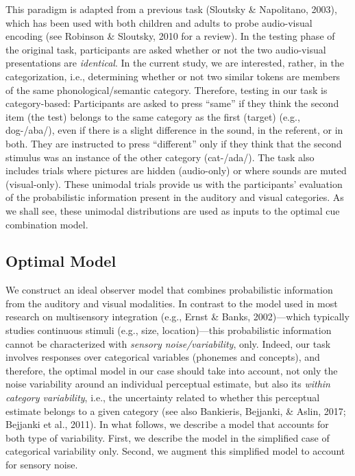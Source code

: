 \documentclass[english,floatsintext,man]{apa6}
\theoremstyle{definition}
\theoremstyle{definition}
\theoremstyle{definition}
\theoremstyle{remark}
\begin{document}
This paradigm is adapted from a previous task (Sloutsky \& Napolitano,
2003), which has been used with both children and adults to probe
audio-visual encoding (see Robinson \& Sloutsky, 2010 for a review). In
the testing phase of the original task, participants are asked whether
or not the two audio-visual presentations are \emph{identical}. In the
current study, we are interested, rather, in the categorization, i.e.,
determining whether or not two similar tokens are members of the same
phonological/semantic category. Therefore, testing in our task is
category-based: Participants are asked to press \enquote{same} if they
think the second item (the test) belongs to the same category as the
first (target) (e.g., dog-/aba/), even if there is a slight difference
in the sound, in the referent, or in both. They are instructed to press
\enquote{different} only if they think that the second stimulus was an
instance of the other category (cat-/ada/). The task also includes
trials where pictures are hidden (audio-only) or where sounds are muted
(visual-only). These unimodal trials provide us with the participants'
evaluation of the probabilistic information present in the auditory and
visual categories. As we shall see, these unimodal distributions are
used as inputs to the optimal cue combination model.

\subsection{Optimal Model}\label{optimal-model}

We construct an ideal observer model that combines probabilistic
information from the auditory and visual modalities. In contrast to the
model used in most research on multisensory integration (e.g., Ernst \&
Banks, 2002)---which typically studies continuous stimuli (e.g., size,
location)---this probabilistic information cannot be characterized with
\emph{sensory noise/variability}, only. Indeed, our task involves
responses over categorical variables (phonemes and concepts), and
therefore, the optimal model in our case should take into account, not
only the noise variability around an individual perceptual estimate, but
also its \emph{within category variability}, i.e., the uncertainty
related to whether this perceptual estimate belongs to a given category
(see also Bankieris, Bejjanki, \& Aslin, 2017; Bejjanki et al., 2011).
In what follows, we describe a model that accounts for both type of
variability. First, we describe the model in the simplified case of
categorical variability only. Second, we augment this simplified model
to account for sensory noise.
\end{document}
